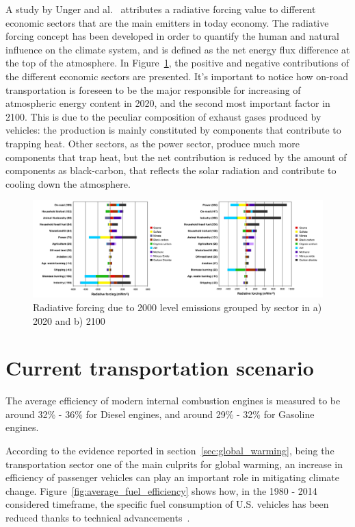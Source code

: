 A study by Unger and al.~\cite{Unger2010} attributes a radiative forcing value to different economic sectors that are the main emitters in today economy. The radiative forcing concept has been developed in order to quantify the human and natural influence on the climate system, and is defined as the net energy flux difference at the top of the atmosphere. In Figure~\ref{fig:radiative_forcing}, the positive and negative contributions of the different economic sectors are presented. It's important to notice how on-road transportation is foreseen to be the major responsible for increasing of atmospheric energy content in 2020, and the second most important factor in 2100. This is due to the peculiar composition of exhaust gases produced by vehicles: the production is  mainly constituted by components that contribute to trapping heat. Other sectors, as the power sector, produce much more components that trap heat, but the net contribution is reduced by the amount of components as black-carbon, that reflects the solar radiation and contribute to cooling down the atmosphere. 

\begin{figure}[ht]
  \centering
  \includegraphics[width=\textwidth]{figures/introduction/radiative_forcing.png}
  \caption{Radiative forcing due to 2000 level emissions grouped by sector in a) 2020 and b) 2100 \label{fig:radiative_forcing}}
\end{figure}

\section{Current transportation scenario}

The average efficiency of modern internal combustion engines is measured to be around 32\% - 36\% for Diesel engines, and around 29\% - 32\% for Gasoline engines.

According to the evidence reported in section~\ref{sec:global_warming}, being the transportation sector one of the main culprits for global warming, an increase in efficiency of passenger vehicles can play an important role in mitigating climate change. Figure~\ref{fig:average_fuel_efficiency} shows how, in the 1980 - 2014 considered timeframe, the specific fuel consumption of U.S. vehicles has been reduced thanks to technical advancements~\cite{BureauofTransportationStatistics2016}.


